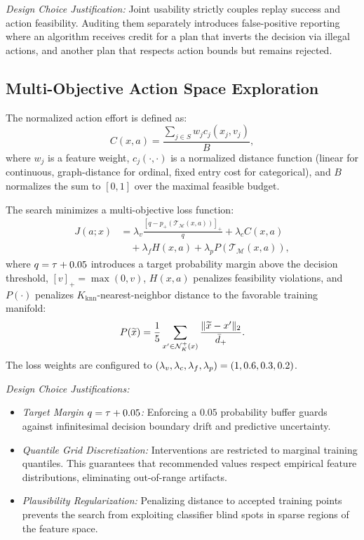 \documentclass[nolineno]{paper/ieee-access/ieeeaccess}%
\newcommand{\SCM}{\ensuremath{\mathcal{M}}}
\newcommand{\Replay}{\ensuremath{\mathcal{T}_{\SCM}}}
\begin{document}
\emph{Design Choice Justification:} Joint usability strictly couples replay success and action feasibility. Auditing them separately introduces false-positive reporting where an algorithm receives credit for a plan that inverts the decision via illegal actions, and another plan that respects action bounds but remains rejected.

\subsection{Multi-Objective Action Space Exploration}
The normalized action effort is defined as:
\begin{equation}
  C(x, a) = \frac{\sum_{j \in S} w_j c_j(x_j, v_j)}{B},
  \label{eq:cost}
\end{equation}
where $w_j$ is a feature weight, $c_j(\cdot, \cdot)$ is a normalized distance function (linear for continuous, graph-distance for ordinal, fixed entry cost for categorical), and $B$ normalizes the sum to $[0, 1]$ over the maximal feasible budget.

The search minimizes a multi-objective loss function:
\begin{align}
  J(a; x) &= \lambda_v \frac{[q - p_+(\Replay(x, a))]_+}{q} + \lambda_c C(x, a) \nonumber \\
          &\quad + \lambda_f H(x, a) + \lambda_p P(\Replay(x, a)),
  \label{eq:objective}
\end{align}
where $q = \tau + 0.05$ introduces a target probability margin above the decision threshold, $[v]_+ = \max(0, v)$, $H(x, a)$ penalizes feasibility violations, and $P(\cdot)$ penalizes $K_{\mathrm{knn}}$-nearest-neighbor distance to the favorable training manifold:
\begin{equation}
  P(\widetilde{x}) = \frac{1}{5} \sum_{x' \in \mathcal{N}_K^+(x)} \frac{\|\widetilde{x} - x'\|_2}{\bar{d}_+}.
  \label{eq:plausibility}
\end{equation}
The loss weights are configured to $(\lambda_v, \lambda_c, \lambda_f, \lambda_p) = (1, 0.6, 0.3, 0.2)$.

\emph{Design Choice Justifications:} 
\begin{itemize}
\item \emph{Target Margin $q=\tau+0.05$:} Enforcing a $0.05$ probability buffer guards against infinitesimal decision boundary drift and predictive uncertainty.
\item \emph{Quantile Grid Discretization:} Interventions are restricted to \GridPoints{} marginal training quantiles. This guarantees that recommended values respect empirical feature distributions, eliminating out-of-range artifacts.
\item \emph{Plausibility Regularization:} Penalizing distance to accepted training points prevents the search from exploiting classifier blind spots in sparse regions of the feature space.
\end{itemize}
\end{document}
